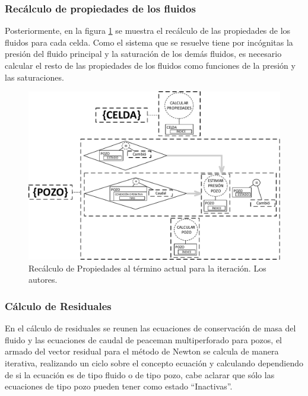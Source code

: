 \subsubsection{Recálculo de propiedades de los fluidos}\label{subsec:PS_TimeK}
Posteriormente, en la figura \ref{fig:TimeK} se muestra el recálculo de las propiedades de los fluidos para cada celda. Como el sistema que se resuelve tiene por incógnitas la presión del fluido principal y la saturación de los demás fluidos, es necesario calcular el resto de las propiedades de los fluidos como funciones de la presión y las saturaciones. \\%

\begin{figure}[h]
	\centering%
	\includegraphics[width=\linewidth]{Fig/TiempoK.pdf}%
	\caption[Recálculo de Propiedades al término actual para la iteración.]{Recálculo de Propiedades al término actual para la iteración. Los autores.} \label{fig:TimeK}
\end{figure}

\subsubsection{Cálculo de Residuales}\label{subsec:Residual}
En el cálculo de residuales se reunen las ecuaciones de conservación de masa del fluido y las ecuaciones de caudal de peaceman multiperforado para pozos, el armado del vector residual para el método de Newton se calcula de manera iterativa, realizando un ciclo sobre el concepto ecuación y calculando dependiendo de si la ecuación es de tipo fluido o de tipo pozo, cabe aclarar que sólo las ecuaciones de tipo pozo pueden tener como estado ``Inactivas''.\\

